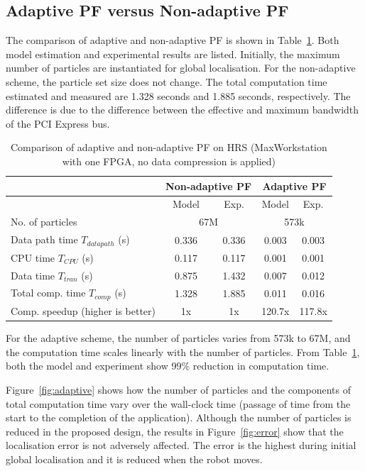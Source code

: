 \subsection{Adaptive PF versus Non-adaptive PF}
The comparison of adaptive and non-adaptive PF is shown in Table~\ref{tab:pf}.
Both model estimation and experimental results are listed.
Initially, the maximum number of particles are instantiated for global localisation.
For the non-adaptive scheme, the particle set size does not change.
The total computation time estimated and measured are 1.328 seconds and 1.885 seconds, respectively.
The difference is due to the difference between the effective and maximum bandwidth of the PCI Express bus.

\begin{table}[h]
	\setlength{\tabcolsep}{5pt}
	\begin{spacing}{1.0}
	\caption{Comparison of adaptive and non-adaptive PF on HRS (MaxWorkstation with one FPGA, no data compression is applied)\label{tab:pf}}{
	\centering
	\smallskip
		\begin{tabular}{| l || c c | c c |}
			\hline
			 \multirow{2}{*}{}  & \multicolumn{2}{|c|}{Non-adaptive PF} & \multicolumn{2}{|c|}{Adaptive PF} \\
			\hline
			  & Model & Exp. & Model & Exp. \\
			\hline
			\hline
			 No. of particles & \multicolumn{2}{|c|}{67M} & \multicolumn{2}{|c|}{573k} \\
			\hline
			 Data path time $T_{datapath}$ (s) 		& 0.336 & 0.336 & 0.003 & 0.003 \\
			 CPU time $T_{CPU}$ (s) 				& 0.117 & 0.117 & 0.001 & 0.001 \\
			 Data time $T_{tran}$ (s) 				& 0.875 & 1.432 & 0.007 & 0.012 \\
			 Total comp. time $T_{comp}$ (s)			& 1.328 & 1.885 & 0.011	& 0.016 \\
			\hline
			 Comp. speedup (higher is better)		& 1x	& 1x	& 120.7x	& 117.8x \\
			\hline
		\end{tabular}
	}
	\end{spacing}
\end{table}

For the adaptive scheme, the number of particles varies from 573k to 67M, and the computation time scales linearly with the number of particles.
From Table~\ref{tab:pf}, both the model and experiment show 99\% reduction in computation time.

Figure~\ref{fig:adaptive} shows how the number of particles and the components of total computation time vary over the wall-clock time (passage of time from the start to the completion of the application).
Although the number of particles is reduced in the proposed design, the results in Figure~\ref{fig:error} show that the localisation error is not adversely affected.
The error is the highest during initial global localisation and it is reduced when the robot moves.

